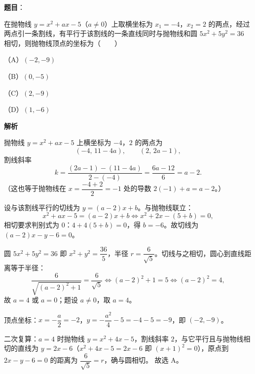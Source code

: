 \begin{answer}

\textbf{题目}：

在抛物线 $y=x^2+ax-5$（$a\neq0$）上取横坐标为 $x_1=-4$，$x_2=2$ 的两点，经过两点引一条割线，有平行于该割线的一条直线同时与抛物线和圆 $5x^2+5y^2=36$ 相切，则抛物线顶点的坐标为\mbox{（　　）}

（A）$(-2,-9)$

（B）$(0,-5)$

（C）$(2,-9)$

（D）$(1,-6)$

\textbf{解析}

抛物线 $y=x^2+ax-5$ 上横坐标为 $-4$，$2$ 的两点为
\nopagebreak[4]
\[(-4,\,11-4a),\qquad (2,\,2a-1),\]
割线斜率
\nopagebreak[4]
\[k=\frac{(2a-1)-(11-4a)}{2-(-4)}=\frac{6a-12}{6}=a-2.\]
（这也等于抛物线在 $x=\dfrac{-4+2}{2}=-1$ 处的导数 $2(-1)+a=a-2$。）

设与该割线平行的切线为 $y=(a-2)x+b$。与抛物线联立：
\nopagebreak[4]
\[x^2+ax-5=(a-2)x+b\iff x^2+2x-(5+b)=0,\]
相切要求判别式为 $0$：$4+4(5+b)=0$，得 $b=-6$。故切线为 $(a-2)x-y-6=0$。

圆 $5x^2+5y^2=36$ 即 $x^2+y^2=\dfrac{36}{5}$，半径 $r=\dfrac{6}{\sqrt5}$。切线与之相切，圆心到直线距离等于半径：
\nopagebreak[4]
\[\frac{6}{\sqrt{(a-2)^2+1}}=\frac{6}{\sqrt5}\iff (a-2)^2+1=5\iff (a-2)^2=4,\]
故 $a=4$ 或 $a=0$；题设 $a\neq0$，取 $a=4$。

顶点坐标：$x=-\dfrac a2=-2$，$y=-\dfrac{a^2}{4}-5=-4-5=-9$，即 $(-2,-9)$。

二次复算：$a=4$ 时抛物线 $y=x^2+4x-5$，割线斜率 $2$，与它平行且与抛物线相切的直线为 $y=2x-6$（$x^2+4x-5=2x-6$ 即 $(x+1)^2=0$），原点到 $2x-y-6=0$ 的距离为 $\dfrac{6}{\sqrt5}=r$，确与圆相切。
故选 A。


\end{answer}
